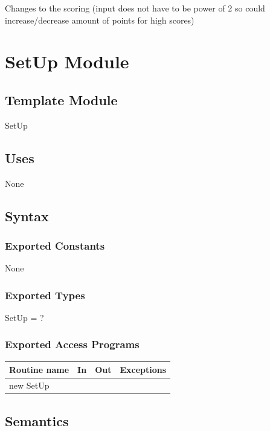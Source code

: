 \documentclass[12pt]{article}
\begin{document}
\noindent Changes to the scoring (input does not have to be power of 2 so could increase/decrease amount of points for high scores)

\newpage

\section* {SetUp Module}

\subsection*{Template Module}

SetUp

\subsection* {Uses}

None

\subsection* {Syntax}

\subsubsection* {Exported Constants}

None

\subsubsection* {Exported Types}

SetUp = ?

\subsubsection* {Exported Access Programs}

\begin{tabular}{| l | l | l | p{5cm} |}
\hline
\textbf{Routine name} & \textbf{In} & \textbf{Out} & \textbf{Exceptions}\\
\hline
new SetUp & & & \\
\hline
\end{tabular}

\subsection* {Semantics}
\end{document}
